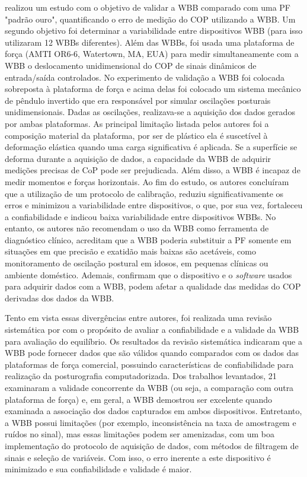 \cite{leach2014validating} realizou um estudo com o objetivo de validar a WBB comparado com uma PF "padrão ouro", quantificando o erro de medição do COP utilizando a WBB. Um segundo objetivo foi determinar a variabilidade entre dispositivos WBB (para isso utilizaram 12 WBBs diferentes). Além das WBBs, foi usada uma plataforma de força (AMTI OR6-6, Watertown, MA, EUA) para medir simultaneamente com a WBB o deslocamento unidimensional do COP de sinais dinâmicos de entrada/saída controlados. No experimento de validação a WBB foi colocada sobreposta à plataforma de força e acima delas foi colocado um sistema mecânico de pêndulo invertido que era responsável por simular oscilações posturais unidimensionais. Dadas as oscilações, realizava-se a aquisição dos dados gerados por ambas plataformas. As principal limitação listada pelos autores foi a composição material da plataforma, por ser de plástico ela é suscetível à deformação elástica quando uma carga significativa é aplicada. Se a superfície se deforma durante a aquisição de dados, a capacidade da WBB de adquirir medições precisas de CoP pode ser prejudicada. Além disso, a WBB é incapaz de medir momentos e forças horizontais. Ao fim do estudo, os autores concluíram que a utilização de um protocolo de calibração, reduziu significativamente os erros e minimizou a variabilidade entre dispositivos, o que, por sua vez, fortaleceu a confiabilidade e indicou baixa variabilidade entre dispositivos WBBs. No entanto, os autores não recomendam o uso da WBB como ferramenta de diagnóstico clínico, acreditam que a WBB poderia substituir a PF somente em situações em que precisão e exatidão mais baixas são acetáveis, como monitoramento de oscilação postural em idosos, em pequenas clínicas ou ambiente doméstico. Ademais, confirmam que o dispositivo e o \textit{software} usados para adquirir dados com a WBB, podem afetar a qualidade das medidas do COP derivadas dos dados da WBB.


Tento em vista essas divergências entre autores, foi realizada uma revisão sistemática por \cite{clark2018reliability} com o propósito de avaliar a confiabilidade e a validade da WBB para avaliação do equilíbrio. Os resultados da revisão sistemática indicaram que a WBB pode fornecer dados que são válidos quando comparados com os dados das plataformas de força comercial, possuindo características de confiabilidade para realização da posturografia computadorizada. Dos trabalhos levantados, 21 examinaram a validade concorrente da WBB (ou seja, a comparação com outra plataforma de força) e, em geral, a WBB demostrou ser excelente quando examinada a associação dos dados capturados em ambos dispositivos. Entretanto, a WBB possui limitações (por exemplo, inconsistência na taxa de amostragem e ruídos no sinal), mas essas limitações podem ser amenizadas, com um boa implementação do protocolo de aquisição de dados, com métodos de filtragem de sinais e seleção de variáveis. Com isso, o erro inerente a este dispositivo é minimizado e sua confiabilidade e validade é maior.

